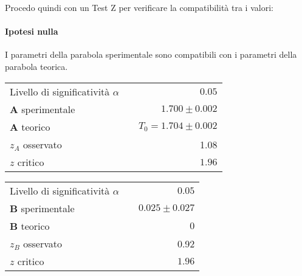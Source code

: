 \documentclass{article}
\begin{document}
	\noindent
	Procedo quindi con un Test Z per verificare la compatibilità tra i valori:
	
	\paragraph{Ipotesi nulla} I parametri della parabola sperimentale sono compatibili con i parametri della parabola teorica.
	
	\vspace{0.7cm}
	\begin{minipage}{0.5\textwidth}
		\begin{table}[H]
			\centering
			\begin{tabular}{lr} 
				Livello di significatività $\alpha$		&$\quad 0.05$  \\
				\textbf{A} sperimentale				& $\quad1.700 \pm 0.002 $\\
				\textbf{A} teorico					& $\quad T_0  = 1.704 \pm 0.002$ \\
				$z_{A}$ osservato 					& $\quad$1.08 \\
				$z$ critico     	& $\quad 1.96$
			\end{tabular}
		\end{table}
	\end{minipage}
	\begin{minipage}{0.5\textwidth}
		\begin{table}[H]
			\centering
			\begin{tabular}{lr} 
				Livello di significatività $\alpha$		&$\quad 0.05$  \\
				\textbf{B} sperimentale				& $\quad0.025 \pm  0.027$	\\ 
				\textbf{B} teorico					& $\quad 0$ \\
				$z_{B}$ osservato 					& $\quad$ 0.92 \\
				$z$ critico     	& $\quad 1.96$
			\end{tabular}
		\end{table}
	\end{minipage}
	
\end{document}
